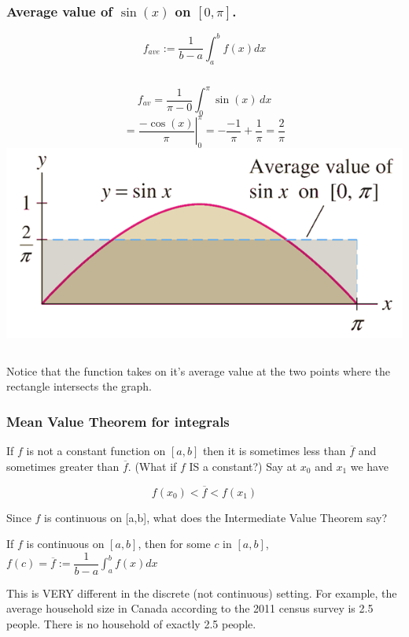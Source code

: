 \begin{frame}

\frametitle{Average value of $\sin(x)$ on $[0,\pi]$.}
\[
f_{ave}:=\dfrac{1}{b-a} \int_a^b f(x) dx
\] \pause 
\begin{columns}[c]
\[
f_{av}=\frac{1}{\pi-0}\int_0^\pi\sin(x)\,dx
\]    
\pause 
\[
=\left.\frac{-\cos(x)}{\pi}\right|_0^\pi=-\frac{-1}{\pi}+\frac{1}{\pi}=\frac2\pi
\]       
\pause
{\includegraphics[width=\textwidth]{average-value/pictures/ex2}}
\end{columns}
\pause
Notice that the function takes on it's average value at the two points where the rectangle intersects the graph.

\end{frame}


\begin{frame}
\frametitle{Mean Value Theorem for integrals}

If $ f $ is not a constant function on $ [a,b] $ then  it is sometimes less than $\overline{f}$ and sometimes  greater than $\overline{f}$. (What if $ f $ IS a constant?)   Say at $x_0$ and $x_1$ we have

\[
f(x_0)<\overline{f}<f(x_1)
\]

Since $ f $ is continuous on [a,b], what does the Intermediate Value Theorem say?

\pause

\begin{theorem}
If $f$ is continuous on $[a,b]$, then for some $c$ in $[a,b]$, $f(c)=\overline{f}:=\dfrac{1}{b-a} \int_a^b f(x) dx$
\end{theorem}

\pause

This is VERY different in the discrete (not continuous) setting. For example, the average household size in Canada according to the 2011 census survey is 2.5 people.  \pause There is no household of exactly 2.5 people.


\end{frame}


